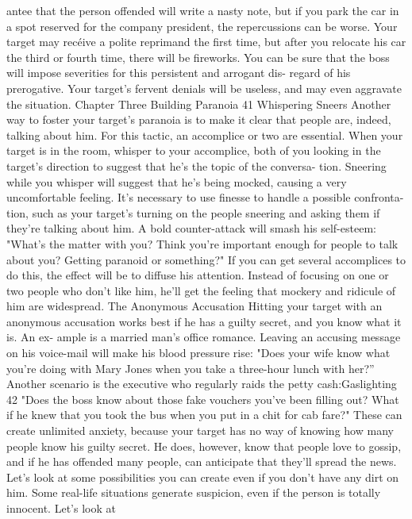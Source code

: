 \documentclass{book}
\begin{document}
antee that the person offended will write a nasty note, but if you 
park the car in a spot reserved for the company president, the 
repercussions can be worse. Your target may recéive a polite 
reprimand the first time, but after you relocate his car the third 
or fourth time, there will be fireworks. You can be sure that the 
boss will impose severities for this persistent and arrogant dis- 
regard of his prerogative. Your target's fervent denials will be 
useless, and may even aggravate the situation. 
Chapter Three 
Building Paranoia 
41 
Whispering Sneers 
Another way to foster your target's paranoia is to make it 
clear that people are, indeed, talking about him. For this tactic, 
an accomplice or two are essential. When your target is in the 
room, whisper to your accomplice, both of you looking in the 
target's direction to suggest that he's the topic of the conversa- 
tion. Sneering while you whisper will suggest that he's being 
mocked, causing a very uncomfortable feeling. 
It's necessary to use finesse to handle a possible confronta- 
tion, such as your target's turning on the people sneering and 
asking them if they're talking about him. A bold counter-attack 
will smash his self-esteem: 
"What's the matter with you? Think you're important 
enough for people to talk about you? Getting paranoid 
or something?" 
If you can get several accomplices to do this, the effect will 
be to diffuse his attention. Instead of focusing on one or two 
people who don't like him, he'll get the feeling that mockery 
and ridicule of him are widespread. 
The Anonymous Accusation 
Hitting your target with an anonymous accusation works 
best if he has a guilty secret, and you know what it is. An ex- 
ample is a married man’s office romance. Leaving an accusing 
message on his voice-mail will make his blood pressure rise: 
"Does your wife know what you're doing with Mary 
Jones when you take a three-hour lunch with her?” 
Another scenario is the executive who regularly raids the 
petty cash:Gaslighting 
42 
"Does the boss know about those fake vouchers you've 
been filling out? What if he knew that you took the bus 
when you put in a chit for cab fare?" 
These can create unlimited anxiety, because your target has 
no way of knowing how many people know his guilty secret. 
He does, however, know that people love to gossip, and if he 
has offended many people, can anticipate that they'll spread the 
news. 
Let's look at some possibilities you can create even if you 
don't have any dirt on him. Some real-life situations generate 
suspicion, even if the person is totally innocent. Let's look at 
\end{document}
